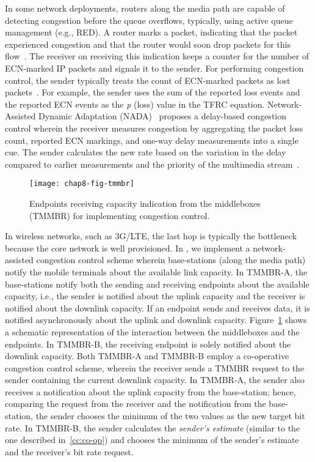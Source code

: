 
In some network deployments, routers along the media path are capable of
detecting congestion before the queue overflows, typically, using active queue
management (e.g., RED). A router marks a packet, indicating that the packet
experienced congestion and that the router would soon drop packets for this
flow~\cite{rfc3168}. The receiver on receiving this indication keeps a counter
for the number of ECN-marked IP packets and signals it to the sender. For
performing congestion control, the sender typically treats the count of 
ECN-marked packets as lost packets~\cite{rfc6679}. For example, the sender uses
the sum of the reported loss events and the reported ECN events as the
\emph{p} (loss) value in the TFRC equation. Network-Assisted Dynamic
Adaptation (NADA)~\cite{rmcat-nada} proposes a delay-based congestion control 
wherein the receiver measures congestion by aggregating the packet loss count,
reported ECN markings, and one-way delay measurements into a single cue. The
sender calculates the new rate based on the variation in the delay compared 
to earlier measurements and the priority of the multimedia stream~\cite{pv-nada}.

\begin{figure}
\texttt{[image: chap8-fig-tmmbr]}
  \caption{Endpoints receiving capacity indication from the middleboxes
  (TMMBR) for implementing congestion control.}
\label{fig:cc:tmmbrab}
\end{figure}

In wireless networks, such as 3G/LTE, the last hop is typically the bottleneck
because the core network is well provisioned. In , we
implement a network-assisted congestion control scheme wherein base-stations
(along the media path) notify the mobile terminals about the available link
capacity. In TMMBR-A, the base-stations notify both the sending and receiving
endpoints about the available capacity, i.e., the sender is notified about the
uplink capacity and the receiver is notified about the downlink capacity. If
an endpoint sends and receives data, it is notified asynchronously about the
uplink and downlink capacity. Figure~\ref{fig:cc:tmmbrab} shows a schematic
representation of the interaction between the middleboxes and the
endpoints. In TMMBR-B, the receiving endpoint is solely notified about the
downlink capacity. Both TMMBR-A and TMMBR-B employ a co-operative congestion
control scheme, wherein the receiver sends a TMMBR request to the sender
containing the current downlink capacity. In TMMBR-A, the sender also receives
a notification about the uplink capacity from the base-station; hence,
comparing the request from the receiver and the notification from the base-station, 
the sender chooses the minimum of the two values as the new target bit rate. In
TMMBR-B, the sender calculates the \emph{sender's estimate} (similar to the
one described in~\ref{cc:co-op}) and chooses the minimum of the sender's
estimate and the receiver's bit rate request. 


